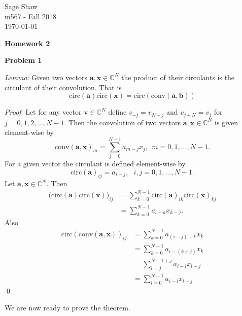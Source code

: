 \documentclass[12pt]{article}
\newcommand{\problem}[1]{\hspace{-4 ex} \large \textbf{Problem #1} }
\renewenvironment{proof}{\hspace{-4 ex} \emph{Proof}:}{\qed}
\newcommand{\CC}{\mathbb{C}}
\renewcommand{\vec}[1]{\boldsymbol{\mathbf{#1}}}
\begin{document}
	\thispagestyle{empty}
	
	\begin{flushright}
		Sage Shaw \\
		m567 - Fall 2018 \\
		\today
	\end{flushright}
	
\begin{center}{\large \textbf{Homework 2}}\end{center}
\bigbreak

\hspace{-.5 ex}\problem{1}

\textit{Lemma}: Given two vectors $\vec{a}, \vec{x} \in \CC^N$ the product of their circulants is the circulant of their convolution. That is
$$
\text{circ}(\vec{a})\text{circ}(\vec{x}) = \text{circ}(\text{conv}(\vec{a}, \vec{b}))
$$

\begin{proof}
	Let for any vector $\vec{v} \in \CC^N$ define $v_{-j} = v_{N-j}$ and $v_{j+N} = v_j$ for $j=0, 1, 2, \dots, N-1$. Then the convolution of two vectors $\vec{a}, \vec{x} \in \CC^N$ is given element-wise by
	$$
	\text{conv}(\vec{a}, \vec{x})_m = \sum\limits_{j=0}^{N-1} a_{m-j}x_j, \ \ m=0,1,\dots, N-1 \text{.}
	$$
	For a given vector the circulant is defined element-wise by
	$$
	\text{circ}(\vec{a})_{ij} = a_{i-j}, \ \ \ i,j=0,1,\dots, N-1\text{.}
	$$
	Let $\vec{a},\vec{x} \in \CC^N$. Then
	\begin{align*}
		\big( \text{circ}(\vec{a}) \text{circ}(\vec{x}) \big)_{ij} &= \sum\limits_{k=0}^{N-1} \text{circ}(\vec{a})_{ik} \text{circ}(\vec{x})_{kj} \\
		&= \sum\limits_{k=0}^{N-1} a_{i-k} x_{k-j} \text{.}
	\end{align*}
	Also
	\begin{align*}
	\text{circ}(\text{conv}(\vec{a}, \vec{x}))_{ij} &= \sum\limits_{k=0}^{N-1} a_{(i-j)-k}x_k \\
	&= \sum\limits_{k=0}^{N-1} a_{i-(k+j)}x_k \\
	&= \sum\limits_{l=j}^{N-1+j} a_{i-l}x_{l-j} \\
	&= \sum\limits_{l=0}^{N-1} a_{i-l}x_{l-j}
	\end{align*}
\end{proof}
\bigbreak

We are now ready to prove the theorem.\bigbreak
\end{document}
